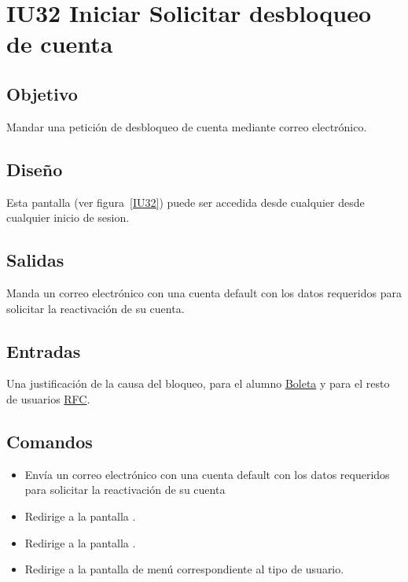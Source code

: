 
\section{IU32 Iniciar Solicitar desbloqueo de cuenta}

\subsection{Objetivo}
    Mandar una petición de desbloqueo de cuenta mediante correo electrónico.

\subsection{Diseño}
	Esta pantalla  (ver figura~\ref{IU32}) puede ser accedida desde cualquier desde cualquier inicio de sesion.



\subsection{Salidas}

    Manda un correo electrónico con una cuenta default con los datos requeridos para solicitar la reactivación de su cuenta.

\subsection{Entradas}
    Una justificación de la causa del bloqueo, para el alumno \hyperlink{Alumno.Boleta}{Boleta} y para el resto de usuarios \hyperlink{Empleado.RFC}{RFC}.


\subsection{Comandos}
\begin{itemize}

    \item {} Envía un correo electrónico con una cuenta default con los datos requeridos para solicitar la reactivación de su cuenta
    \item {} Redirige a la pantalla .
    \item {} Redirige a la pantalla .
    \item {} Redirige a la pantalla de menú correspondiente al tipo de usuario.
	
\end{itemize}


